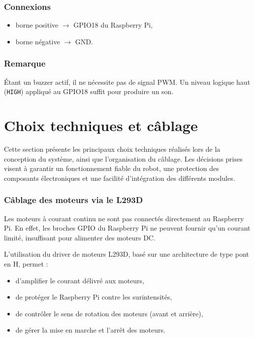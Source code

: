 \subsubsection{Connexions}
\begin{itemize}
    \item borne positive $\rightarrow$ GPIO18 du Raspberry Pi,
    \item borne négative $\rightarrow$ GND.
\end{itemize}

\subsubsection{Remarque}
Étant un buzzer actif, il ne nécessite pas de signal PWM. Un niveau logique haut (\texttt{HIGH}) appliqué au GPIO18 suffit pour produire un son.

\section{Choix techniques et câblage}

Cette section présente les principaux choix techniques réalisés lors de la conception du système, ainsi que l’organisation du câblage. Les décisions prises visent à garantir un fonctionnement fiable du robot, une protection des composants électroniques et une facilité d’intégration des différents modules.

\subsubsection{Câblage des moteurs via le L293D}

Les moteurs à courant continu ne sont pas connectés directement au Raspberry Pi. En effet, les broches GPIO du Raspberry Pi ne peuvent fournir qu’un courant limité, insuffisant pour alimenter des moteurs DC.

L’utilisation du driver de moteurs L293D, basé sur une architecture de type pont en H, permet :
\begin{itemize}
    \item d’amplifier le courant délivré aux moteurs,
    \item de protéger le Raspberry Pi contre les surintensités,
    \item de contrôler le sens de rotation des moteurs (avant et arrière),
    \item de gérer la mise en marche et l’arrêt des moteurs.
\end{itemize}

